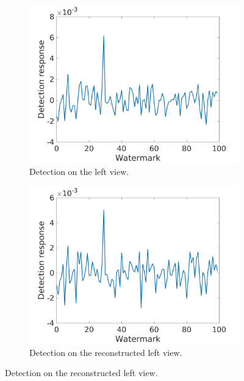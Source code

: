 \begin{figure}[h!]
\centering
\begin{subfigure}[t]{0.5\textwidth}
\centering
\includegraphics[width=1\textwidth]{./img/corr_gauss/left_corr_value_1.jpg}
  \caption{\small{Detection on the left view.}\label{fig:gl1}}
\end{subfigure}%
\begin{subfigure}[t]{0.5\textwidth}
\centering
\includegraphics[width=1\textwidth]{./img/corr_gauss/right_warpedwat_corr_value_1.jpg}
\caption{\small{Detection on the reconstructed left view.}\label{fig:grw1}}


\end{subfigure}
\end{figure}
